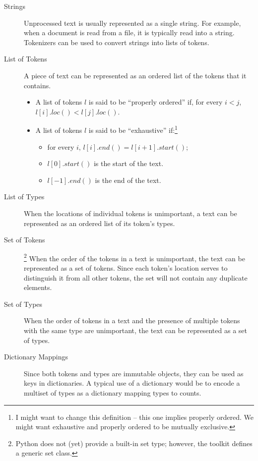 \documentclass[11pt]{article}
\begin{document}
  \begin{description}

    \item[Strings] Unprocessed text is usually represented as a single
    string.  For example, when a document is read from a file, it is
    typically read into a string.  Tokenizers can be used to convert
    strings into lists of tokens.

    \item[List of Tokens] A piece of text can be represented as an
    ordered list of the tokens that it contains.

    \begin{itemize}

        \item A list of tokens $l$ is said to be ``properly ordered''
        if, for every $i<j$, $l[i].loc()<l[j].loc()$.

        \item A list of tokens $l$ is said to be ``exhaustive''
        if:\footnote{I might want to change this definition -- this
        one implies properly ordered.  We might want exhaustive and
        properly ordered to be mutually exclusive.}

        \begin{itemize}
          \item for every $i$, $l[i].end() = l[i+1].start()$; 
          \item $l[0].start()$ is the start of the text.
          \item $l[-1].end()$ is the end of the text.
        \end{itemize}

    \end{itemize}

    \item[List of Types] When the locations of individual tokens is
    unimportant, a text can be represented as an ordered list of its
    token's types.

    \item[Set of Tokens]\footnote{Python does not (yet) provide a
    built-in set type; however, the toolkit defines a generic set
    class.} When the order of the tokens in a text is unimportant, the
    text can be represented as a set of tokens.  Since each token's
    location serves to distinguish it from all other tokens, the set
    will not contain any duplicate elements.

    \item[Set of Types] When the order of tokens in a text and the
    presence of multiple tokens with the same type are unimportant,
    the text can be represented as a set of types.

    \item[Dictionary Mappings] Since both tokens and types are
    immutable objects, they can be used as keys in dictionaries.  A
    typical use of a dictionary would be to encode a multiset of types
    as a dictionary mapping types to counts.

  \end{description}
\end{document}
